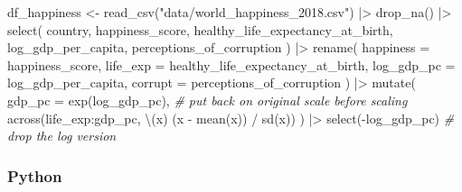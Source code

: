 \documentclass[
  letterpaper,
]{krantz}
\newenvironment{Shaded}{}{}
\newcommand{\AttributeTok}[1]{\textcolor[rgb]{0.49,0.56,0.16}{#1}}
\newcommand{\CommentTok}[1]{\textcolor[rgb]{0.38,0.63,0.69}{\textit{#1}}}
\newcommand{\FunctionTok}[1]{\textcolor[rgb]{0.02,0.16,0.49}{#1}}
\newcommand{\NormalTok}[1]{#1}
\newcommand{\OtherTok}[1]{\textcolor[rgb]{0.00,0.44,0.13}{#1}}
\newcommand{\SpecialCharTok}[1]{\textcolor[rgb]{0.25,0.44,0.63}{#1}}
\newcommand{\StringTok}[1]{\textcolor[rgb]{0.25,0.44,0.63}{#1}}
\begin{document}
\begin{Shaded}
\begin{Highlighting}[]
\NormalTok{df\_happiness }\OtherTok{\textless{}{-}} \FunctionTok{read\_csv}\NormalTok{(}\StringTok{"data/world\_happiness\_2018.csv"}\NormalTok{) }\SpecialCharTok{|\textgreater{}}
    \FunctionTok{drop\_na}\NormalTok{() }\SpecialCharTok{|\textgreater{}}
    \FunctionTok{select}\NormalTok{(}
\NormalTok{        country,}
\NormalTok{        happiness\_score,}
\NormalTok{        healthy\_life\_expectancy\_at\_birth,}
\NormalTok{        log\_gdp\_per\_capita,}
\NormalTok{        perceptions\_of\_corruption}
\NormalTok{    ) }\SpecialCharTok{|\textgreater{}}
    \FunctionTok{rename}\NormalTok{(}
        \AttributeTok{happiness  =}\NormalTok{ happiness\_score,}
        \AttributeTok{life\_exp   =}\NormalTok{ healthy\_life\_expectancy\_at\_birth,}
        \AttributeTok{log\_gdp\_pc =}\NormalTok{ log\_gdp\_per\_capita,}
        \AttributeTok{corrupt    =}\NormalTok{ perceptions\_of\_corruption}
\NormalTok{    ) }\SpecialCharTok{|\textgreater{}}
    \FunctionTok{mutate}\NormalTok{(}
        \AttributeTok{gdp\_pc =} \FunctionTok{exp}\NormalTok{(log\_gdp\_pc), }\CommentTok{\# put back on original scale before scaling}
        \FunctionTok{across}\NormalTok{(life\_exp}\SpecialCharTok{:}\NormalTok{gdp\_pc, \textbackslash{}(x) (x }\SpecialCharTok{{-}} \FunctionTok{mean}\NormalTok{(x)) }\SpecialCharTok{/} \FunctionTok{sd}\NormalTok{(x))}
\NormalTok{    ) }\SpecialCharTok{|\textgreater{}}
    \FunctionTok{select}\NormalTok{(}\SpecialCharTok{{-}}\NormalTok{log\_gdp\_pc) }\CommentTok{\# drop the log version}
\end{Highlighting}
\end{Shaded}

\subsubsection{Python}
\end{document}

